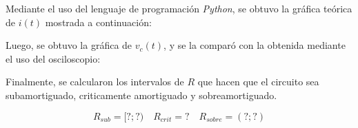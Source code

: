 \documentclass[a4paper]{article}
\begin{document}
Mediante el uso del lenguaje de programación \textit{Python}, se obtuvo la gráfica teórica de $i(t)$ mostrada a continuación:

Luego, se obtuvo la gráfica de $v_c(t)$, y se la comparó con la obtenida mediante el uso del osciloscopio:

Finalmente, se calcularon los intervalos de $R$ que hacen que el circuito sea subamortiguado, criticamente amortiguado y sobreamortiguado.

\[R_{sub}=[?;?) \quad R_{crit}= ? \quad R_{sobre}=(?;?)\]
\end{document}
